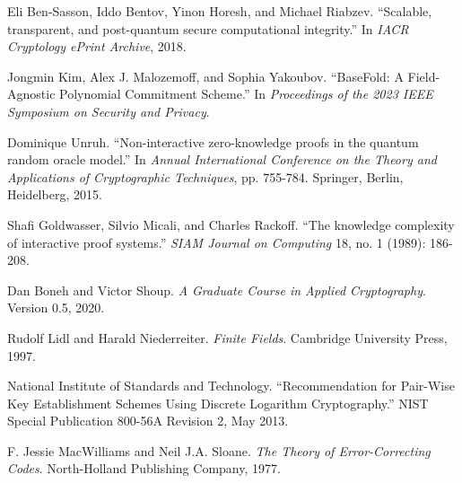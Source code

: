 \documentclass{article}
\theoremstyle{plain}
\theoremstyle{definition}
\theoremstyle{remark}
\theoremstyle{problem}
\begin{document}

\begin{thebibliography}{8}
 Eli Ben-Sasson, Iddo Bentov, Yinon Horesh, and Michael Riabzev. ``Scalable, transparent, and post-quantum secure computational integrity.'' In \emph{IACR Cryptology ePrint Archive}, 2018.

 Jongmin Kim, Alex J. Malozemoff, and Sophia Yakoubov. ``BaseFold: A Field-Agnostic Polynomial Commitment Scheme.'' In \emph{Proceedings of the 2023 IEEE Symposium on Security and Privacy}.

 Dominique Unruh. ``Non-interactive zero-knowledge proofs in the quantum random oracle model.'' In \emph{Annual International Conference on the Theory and Applications of Cryptographic Techniques}, pp. 755-784. Springer, Berlin, Heidelberg, 2015.

 Shafi Goldwasser, Silvio Micali, and Charles Rackoff. ``The knowledge complexity of interactive proof systems.'' \emph{SIAM Journal on Computing} 18, no. 1 (1989): 186-208.

 Dan Boneh and Victor Shoup. \emph{A Graduate Course in Applied Cryptography}. Version 0.5, 2020.

 Rudolf Lidl and Harald Niederreiter. \emph{Finite Fields}. Cambridge University Press, 1997.

 National Institute of Standards and Technology. ``Recommendation for Pair-Wise Key Establishment Schemes Using Discrete Logarithm Cryptography.'' NIST Special Publication 800-56A Revision 2, May 2013.

 F. Jessie MacWilliams and Neil J.A. Sloane. \emph{The Theory of Error-Correcting Codes}. North-Holland Publishing Company, 1977.
\end{thebibliography}
\end{document}

